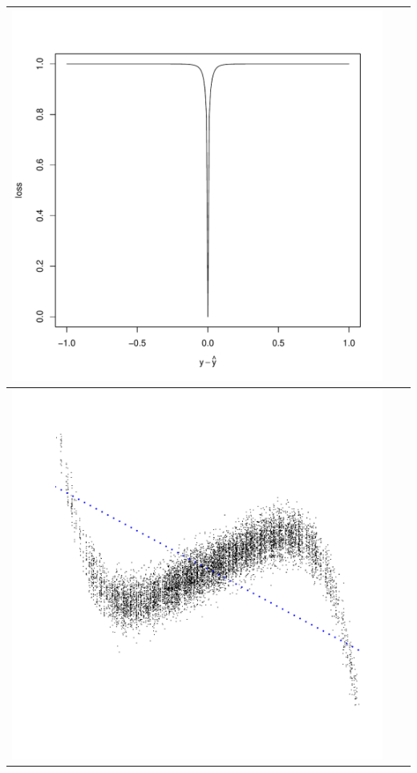 \documentclass{beamer}
\begin{document}
\begin{frame}
\begin{center}
\begin{tabular}{c|c|c}
\includegraphics[scale = 0.2]{loss_20.pdf} \\ \hline
\includegraphics[scale = 0.2]{plot_loss_sq.pdf} &

\end{tabular}
\end{center}
\end{frame}
\end{document}
